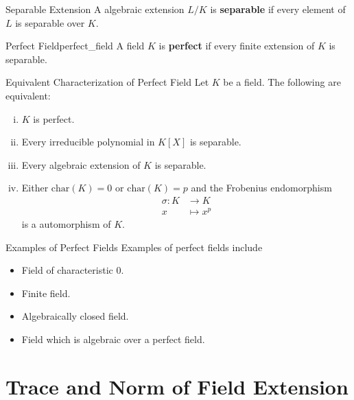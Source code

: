 \begin{definition}{Separable Extension}{}
    A algebraic extension $L/K$ is \textbf{separable} if every element of $L$ is separable over $K$.
\end{definition}

\begin{definition}{Perfect Field}{perfect_field}
    A field $K$ is \textbf{perfect} if every finite extension of $K$ is separable.
\end{definition}

\begin{definition}{Equivalent Characterization of Perfect Field}{}
    Let $K$ be a field. The following are equivalent:
    \begin{enumerate}[(i)]
        \item $K$ is perfect.
        \item Every irreducible polynomial in $K[X]$ is separable.
        \item Every algebraic extension of $K$ is separable.
        \item Either $\mathrm{char}(K)=0$ or $\mathrm{char}(K)=p$ and the Frobenius endomorphism 
        \begin{align*}
            \sigma:K&\longrightarrow K\\
            x&\longmapsto x^p
        \end{align*}
        is a automorphism of $K$.
    \end{enumerate}
    
\end{definition}

\begin{example}{Examples of Perfect Fields}{}
    Examples of perfect fields include
    \begin{itemize}
        \item Field of characteristic $0$.
        \item Finite field.
        \item Algebraically closed field.
        \item Field which is algebraic over a perfect field.
    \end{itemize}
\end{example}


\section{Trace and Norm of Field Extension}


